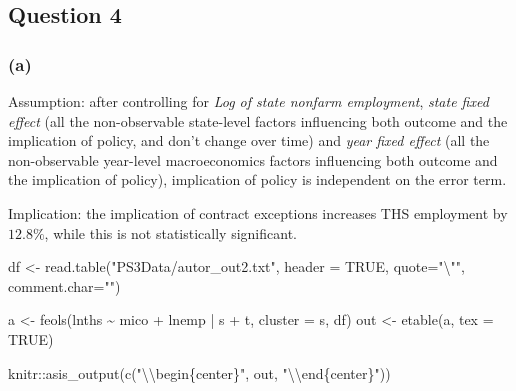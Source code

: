 \documentclass[
]{article}
\newenvironment{Shaded}{\begin{snugshade}}{\end{snugshade}}
\newcommand{\AttributeTok}[1]{\textcolor[rgb]{0.77,0.63,0.00}{#1}}
\newcommand{\ConstantTok}[1]{\textcolor[rgb]{0.00,0.00,0.00}{#1}}
\newcommand{\FunctionTok}[1]{\textcolor[rgb]{0.00,0.00,0.00}{#1}}
\newcommand{\NormalTok}[1]{#1}
\newcommand{\OtherTok}[1]{\textcolor[rgb]{0.56,0.35,0.01}{#1}}
\newcommand{\SpecialCharTok}[1]{\textcolor[rgb]{0.00,0.00,0.00}{#1}}
\newcommand{\StringTok}[1]{\textcolor[rgb]{0.31,0.60,0.02}{#1}}
\begin{document}
\newpage

\hypertarget{question-4}{%
\subsection{Question 4}\label{question-4}}

\hypertarget{a-2}{%
\subsubsection{(a)}\label{a-2}}

Assumption: after controlling for \emph{Log of state nonfarm
employment}, \emph{state fixed effect} (all the non-observable
state-level factors influencing both outcome and the implication of
policy, and don't change over time) and \emph{year fixed effect} (all
the non-observable year-level macroeconomics factors influencing both
outcome and the implication of policy), implication of policy is
independent on the error term.

Implication: the implication of contract exceptions increases THS
employment by \(12.8\%\), while this is not statistically significant.

\begin{Shaded}
\begin{Highlighting}[]
\NormalTok{df }\OtherTok{\textless{}{-}} \FunctionTok{read.table}\NormalTok{(}\StringTok{"PS3Data/autor\_out2.txt"}\NormalTok{, }\AttributeTok{header =} \ConstantTok{TRUE}\NormalTok{, }
                 \AttributeTok{quote=}\StringTok{"}\SpecialCharTok{\textbackslash{}"}\StringTok{"}\NormalTok{, }\AttributeTok{comment.char=}\StringTok{""}\NormalTok{)}

\NormalTok{a }\OtherTok{\textless{}{-}} \FunctionTok{feols}\NormalTok{(lnths }\SpecialCharTok{\textasciitilde{}}\NormalTok{ mico }\SpecialCharTok{+}\NormalTok{ lnemp }\SpecialCharTok{|}\NormalTok{ s }\SpecialCharTok{+}\NormalTok{ t, }\AttributeTok{cluster =} \StringTok{\textquotesingle{}s\textquotesingle{}}\NormalTok{, df)}
\NormalTok{out }\OtherTok{\textless{}{-}} \FunctionTok{etable}\NormalTok{(a, }\AttributeTok{tex =} \ConstantTok{TRUE}\NormalTok{) }
\end{Highlighting}
\end{Shaded}

\begin{Shaded}
\begin{Highlighting}[]
\NormalTok{knitr}\SpecialCharTok{::}\FunctionTok{asis\_output}\NormalTok{(}\FunctionTok{c}\NormalTok{(}\StringTok{"}\SpecialCharTok{\textbackslash{}\textbackslash{}}\StringTok{begin\{center\}"}\NormalTok{, out, }\StringTok{"}\SpecialCharTok{\textbackslash{}\textbackslash{}}\StringTok{end\{center\}"}\NormalTok{)) }
\end{Highlighting}
\end{Shaded}
\end{document}
